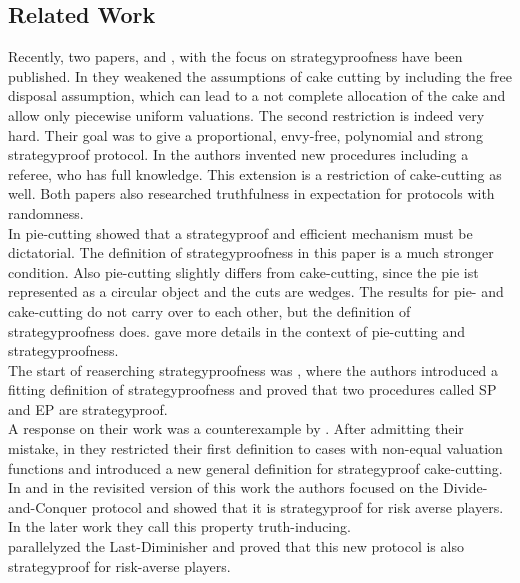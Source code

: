 \pagebreak
\subsection{Related Work}
Recently, two papers, \cite{chen:truth} and \cite{tamuz}, with the focus on strategyproofness have been published. In \cite{chen:truth} they weakened the assumptions of cake cutting by including the free disposal assumption, which can lead to a not complete allocation of the cake and allow only piecewise uniform valuations. The second restriction is indeed very hard. Their goal was to give a proportional, envy-free, polynomial and strong strategyproof protocol. In \cite{tamuz} the authors invented new procedures including a referee, who has full knowledge. This extension is a restriction of cake-cutting as well. Both papers also researched truthfulness in expectation for protocols with randomness.\\ \newline
In pie-cutting \cite{why} showed that a strategyproof and efficient mechanism must be dictatorial. The definition of strategyproofness in this paper is a much stronger condition. Also pie-cutting slightly differs from cake-cutting, since the pie ist represented as a circular object and the cuts are wedges. The results for pie-  and cake-cutting do not carry over to each other, but the definition of strategyproofness does. \cite{pie} gave more details in the context of pie-cutting and strategyproofness. \\
\newline
The start of reaserching strategyproofness was \cite{brams}, where the authors introduced a fitting definition of strategyproofness and proved that two procedures called SP and EP are strategyproof.\\ A response on their work was a counterexample by \cite{ccc}. After admitting their mistake, in \cite{note} they restricted their first definition to cases with non-equal valuation functions and introduced a new general definition for strategyproof cake-cutting.\\
In \cite{dc} and in the revisited version of this work \cite{dc2} the authors focused on the Divide-and-Conquer protocol and showed that it is strategyproof for risk averse players. In the later work they call this property truth-inducing. \\ \cite{lindner:degrees} parallelyzed the Last-Diminisher and proved that this new protocol is also strategyproof for risk-averse players. \pagebreak
